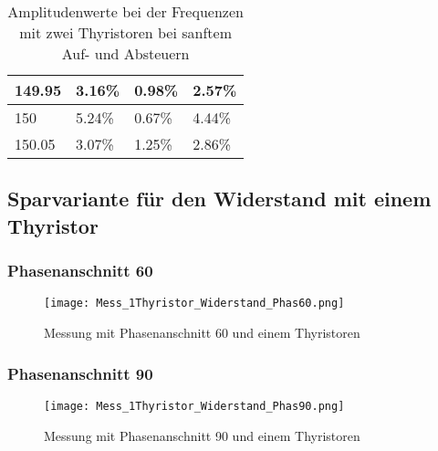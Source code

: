 \begin{appendix}
\begin{table}[ht!]
\begin{tabular}{|l|l|l|l|}
		149.95            & 3.16\%                                                                              & 0.98\%                                                                              & 2.57\%                                                                              \\ \hline
		150               & 5.24\%                                                                              & 0.67\%                                                                              & 4.44\%                                                                              \\ \hline
		150.05            & 3.07\%                                                                              & 1.25\%                                                                              & 2.86\%                                                                              \\ \hline
	\end{tabular}
	\caption{Amplitudenwerte bei der Frequenzen mit zwei Thyristoren bei sanftem Auf- und Absteuern}\label{tab:Mess_2Thyristoren_Spannung_ASM_AufAb_sanft}
\end{table}

\newpage
\subsection{Sparvariante für den Widerstand mit einem Thyristor} \label{sec:Sparvariante_1Thyristor}
\subsubsection*{Phasenanschnitt 60\textdegree}

\begin{figure}[ht]
	\centering
	\texttt{[image: Mess\_1Thyristor\_Widerstand\_Phas60.png]}	
	\caption{Messung mit Phasenanschnitt 60\textdegree \hspace{0.02cm} und einem Thyristoren}\label{fig:Mess_1Thyristor_Phas_60grad}
\end{figure}

\newpage
\subsubsection*{Phasenanschnitt 90\textdegree}

\begin{figure}[ht]
	\centering
	\texttt{[image: Mess\_1Thyristor\_Widerstand\_Phas90.png]}	
	\caption{Messung mit Phasenanschnitt 90\textdegree \hspace{0.02cm} und einem Thyristoren}\label{fig:Mess_1Thyristor_Phas_90grad}
\end{figure}


\end{appendix}
